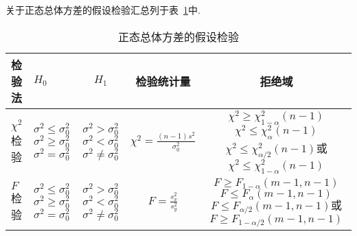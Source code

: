 \begin{example}
	关于正态总体方差的假设检验汇总列于表~\ref{tab7.2.3}中.
		\begin{table}[!ht]
		\centering
		\caption{正态总体方差的假设检验}\label{tab7.2.3}
		\begin{tabularx}{\textwidth}{p{1.5cm}p{1.5cm}ccc}
			\toprule
			检验法&$H_{0}$&$H_{1}$&检验统计量&拒绝域\\
			\midrule
			$\chi ^ { 2 } $检验&\parbox{1.5cm}{$\sigma ^ { 2 } \leq \sigma _ { 0 } ^ { 2 }$\\$\sigma ^ { 2 } \geq \sigma _ { 0 } ^ { 2 }$\\$\sigma ^ { 2 }= \sigma _ { 0 } ^ { 2 }$}&\parbox{1.5cm}{$\sigma ^ { 2 } > \sigma _ { 0 } ^ { 2 }$\\$\sigma ^ { 2 } < \sigma _ { 0 } ^ { 2 }$\\$\sigma ^ { 2 }\ne \sigma _ { 0 } ^ { 2 }$}&$\chi ^ { 2 } = \frac { ( n - 1 ) s ^ { 2 } } { \sigma _ { 0 } ^ { 2 } }$&\parbox{3.5cm}{$\chi ^ { 2 } \geq \chi _ { 1-\alpha} ^ { 2 } ( n - 1 )$\\$\chi ^ { 2 } \leq \chi _ { \alpha } ^ { 2 } ( n - 1 )$\\$\chi ^ { 2 } \leq \chi _ { \alpha/2} ^ { 2 } ( n - 1 )$或\\$\chi ^ { 2 } \leq \chi _ { 1-\alpha } ^ { 2 } ( n - 1 )$}\\
			$F$检验&\parbox{1.5cm}{$\sigma ^ { 2 } \leq \sigma _ { 0 } ^ { 2 }$\\$\sigma ^ { 2 } \geq \sigma _ { 0 } ^ { 2 }$\\$\sigma ^ { 2 }= \sigma _ { 0 } ^ { 2 }$}&\parbox{1.5cm}{$\sigma ^ { 2 } > \sigma _ { 0 } ^ { 2 }$\\$\sigma ^ { 2 } < \sigma _ { 0 } ^ { 2 }$\\$\sigma ^ { 2 }\ne \sigma _ { 0 } ^ { 2 }$}&$F = \frac { s _ { x } ^ { 2 } } { s _ { y } ^ { 2 } }$&\parbox{4.5cm}{$F\geq F_{1-\alpha}\left(m-1,n-1\right)$\\$F\leq F_{\alpha}\left(m-1,n-1\right)$\\$F\leq F_{\alpha/2}\left(m-1,n-1\right)\textrm{或}$\\$F\geq F_{1-\alpha/2}\left(m-1,n-1\right)$}\\
			\bottomrule
		\end{tabularx}
	\end{table}
	
\end{example}
